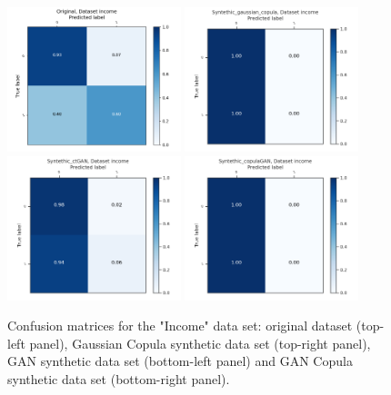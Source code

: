 \documentclass{article}
\begin{document}
\begin{figure}[h!]
	\centering
	\includegraphics[width=0.45\textwidth]{../ConfusionMatrixes/income_Original_.png}
	\includegraphics[width=0.45\textwidth]{../ConfusionMatrixes/income_Syntethic_gaussian_copula_.png}
	\includegraphics[width=0.45\textwidth]{../ConfusionMatrixes/income_Syntethic_ctGAN_.png}
	\includegraphics[width=0.45\textwidth]{../ConfusionMatrixes/income_Syntethic_copulaGAN_.png}

	\caption{Confusion matrices for the "Income" data set: original dataset (top-left panel), Gaussian Copula synthetic data set (top-right panel), GAN synthetic data set (bottom-left panel) and GAN Copula synthetic data set (bottom-right panel).  }
	\label{confusion_income}
\end{figure}
\end{document}
